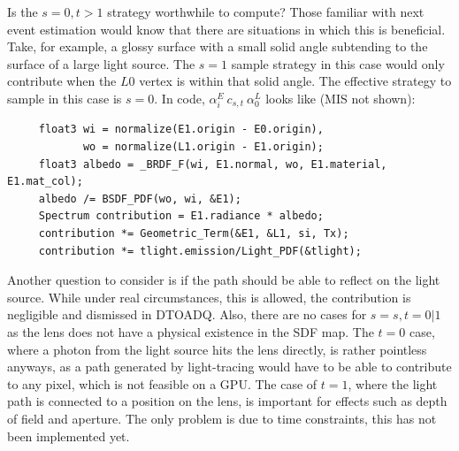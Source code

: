 \documentclass{article}
\begin{document}
    Is the $s = 0, t > 1$
    strategy worthwhile to compute? Those familiar with next event
    estimation would know that there are situations in which this is beneficial.
    Take, for example, a glossy surface with a small solid angle subtending to
    the surface of a large light source. The $s=1$ sample strategy in this case
    would only contribute when the $L0$ vertex is within that solid angle.
    The effective strategy to sample in this case is $s = 0$.
    In code, $\alpha_i^E\:c_{s,t}\:\alpha_0^L$ looks like (MIS not shown):
    \begin{lstlisting}
     float3 wi = normalize(E1.origin - E0.origin),
            wo = normalize(L1.origin - E1.origin);
     float3 albedo = _BRDF_F(wi, E1.normal, wo, E1.material, E1.mat_col);
     albedo /= BSDF_PDF(wo, wi, &E1);
     Spectrum contribution = E1.radiance * albedo;
     contribution *= Geometric_Term(&E1, &L1, si, Tx);
     contribution *= tlight.emission/Light_PDF(&tlight);
    \end{lstlisting}
    
    Another question to consider is if the path should be able to reflect on the
    light source. While under real circumstances, this is allowed, the
    contribution is negligible and dismissed in DTOADQ. Also, there are no cases for $s = s, t = 0|1$ as
    the lens does not have a physical existence in the SDF map. The $t = 0$ case, where a photon from the light source hits the lens directly, is rather pointless anyways, as a path generated by light-tracing would have to be able to contribute to any pixel, which is not feasible on a GPU. The case of $t = 1$, where the light path is connected to a position on the lens, is important for effects such as depth of field and aperture. The only problem is due to time constraints, this has not been implemented yet.
\end{document}
